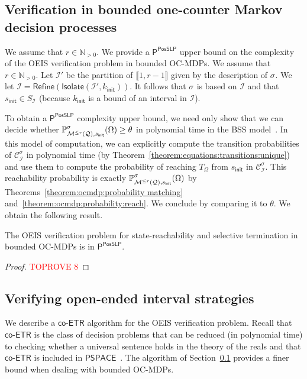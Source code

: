 \documentclass[a4paper,UKenglish,cleveref,autoref,thm-restate,colorlinks]{lipics-v2021}
\newcommand{\init}{\mathsf{init}}
\newcommand{\integerInterval}[1]{\llbracket{}#1\rrbracket{}}
\newcommand{\ptime}{\textsf{P}}
\newcommand{\pspace}{\textsf{PSPACE}}
\newcommand{\posSLP}{\textsf{PosSLP}}
\newcommand{\coetr}{\textsf{co-ETR}}
\newcommand{\IN}{\mathbb{N}}
\newcommand{\INpos}{\IN_{>0}}
\newcommand{\mdp}{\mathcal{M}}
\newcommand{\mdpStateSpace}{S}
\newcommand{\ocmdp}{\mathcal{Q}}
\newcommand{\ocmdpFin}[2]{\mdp^{\leq #2}(#1)}
\newcommand{\ocCount}{k}
\newcommand{\ocConfig}{s}
\newcommand{\counterUB}{r}
\newcommand{\mchain}{\mathcal{C}}
\newcommand{\intPart}{\mathcal{I}}
\newcommand{\compressChainStrat}[1]{\mchain^{#1}_{\intPart}}
\newcommand{\compressChain}{\compressChainStrat{\strat}}
\newcommand{\compressChainStateSpace}{\mdpStateSpace_{\intPart}}
\newcommand{\objective}{\Omega}
\newcommand{\target}{T}
\newcommand{\thresProba}{\theta}
\newcommand{\stratGeneric}[1]{{\sigma_{#1}}}
\newcommand{\strat}{\stratGeneric{}}
\begin{document}
\subsection{Verification in bounded one-counter Markov decision processes}\label{section:verification:algorithms:bounded}
We assume that $\counterUB\in\INpos$.
We provide a $\ptime^{\posSLP}$ upper bound on the complexity of the OEIS verification problem in bounded OC-MDPs.
We assume that $\counterUB\in\INpos$.
Let $\intPart'$ be the partition of $\integerInterval{1, \counterUB-1}$ given by the description of $\strat$.
We let $\intPart = \mathsf{Refine}(\mathsf{Isolate}(\intPart', \ocCount_\init))$.
It follows that $\strat$ is based on $\intPart$ and that $\ocConfig_\init\in\compressChainStateSpace$ (because $\ocCount_\init$ is a bound of an interval in $\intPart$).

To obtain a $\ptime^{\posSLP}$ complexity upper bound, we need only show that we can decide whether $\probaGverb{\ocmdpFin{\ocmdp}{\counterUB}}{\ocConfig_\init}{\strat}(\objective)\geq\thresProba$ in polynomial time in the BSS model~\cite{DBLP:journals/siamcomp/AllenderBKM09}.
In this model of computation, we can explicitly compute the transition probabilities of $\compressChain$ in polynomial time (by Theorem~\ref{theorem:equations:transitions:unique}) and use them to compute the probability of reaching $\target_\objective$ from $\ocConfig_\init$ in $\compressChain$.
This reachability probability is exactly $\probaGverb{\ocmdpFin{\ocmdp}{\counterUB}}{\ocConfig_\init}{\strat}(\objective)$ by Theorems~\ref{theorem:ocmdp:probability matching} and~\ref{theorem:ocmdp:probability:reach}.
We conclude by comparing it to $\thresProba$.
We obtain the following result.

\begin{theorem}\label{theorem:verification:bounded}
  The OEIS verification problem for state-reachability and selective termination in bounded OC-MDPs is in $\ptime^{\posSLP}$.
\end{theorem}
\begin{proof}\textcolor{red}{TOPROVE 8}\end{proof}


\subsection{Verifying open-ended interval strategies}\label{section:verification:algorithms:oeis}

We describe a $\coetr$ algorithm for the OEIS verification problem.
Recall that $\coetr$ is the class of decision problems that can be reduced (in polynomial time) to checking whether a universal sentence holds in the theory of the reals and that $\coetr$ is included in $\pspace$~\cite{DBLP:conf/stoc/Canny88}.
The algorithm of Section~\ref{section:verification:algorithms:bounded} provides a finer bound when dealing with bounded OC-MDPs.
\end{document}
